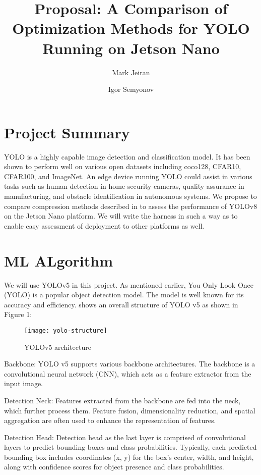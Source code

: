 \documentclass[12pt,english]{article}
\title{
    Proposal: A Comparison of Optimization Methods for YOLO Running on Jetson Nano
}
\author{Mark Jeiran}
\author{Igor Semyonov}
\affil{George Mason University}
\begin{document}
\maketitle

\section{Project Summary}

YOLO is a highly capable image detection and classification model.
It has been shown to perform well on various open datasets including coco128, CFAR10, CFAR100, and ImageNet.
An edge device running YOLO could assist in various tasks such as human detection in home security cameras, quality assurance in manufacturing, and obstacle identification in autonomous systems.
We propose to compare compression methods described in \cite{compression-methods} to assess the performance of YOLOv8 on the Jetson Nano platform.
We will write the harness in such a way as to enable easy assessment of deployment to other platforms as well.

\section{ML ALgorithm}

We will use YOLOv5 in this project.
As mentioned earlier, You Only Look Once (YOLO) is a popular object detection model.
The model is well known for its accuracy and efficiency.
 shows  an overall structure of YOLO v5 as shown in Figure 1:

\begin{figure}[h]
    \texttt{[image: yolo-structure]}
    \caption{YOLOv5 architecture \cite{compression-methods}}
    \label{fig:yolo-structure}
\end{figure}

Backbone: YOLO v5 supports various backbone architectures.
The backbone is a convolutional neural network (CNN), which acts as a feature extractor from the input image.

Detection Neck: Features extracted from the backbone are fed into the neck, which further process them.
Feature fusion, dimensionality reduction, and spatial aggregation are often used to enhance the representation of features.

Detection Head: Detection head as the last layer is comprised of convolutional layers to predict bounding boxes and class probabilities.
Typically, each predicted bounding box includes coordinates (x, y) for the box's center, width, and height, along with confidence scores for object presence and class probabilities.
\end{document}
